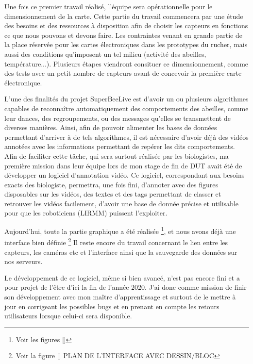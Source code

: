 \documentclass[11pt,french,a4paper]{report}
\begin{document}
\begin{titlepage}
Une fois ce premier travail réalisé, l'équipe sera opérationnelle pour le dimensionnement de la carte. Cette partie du travail
commencera par une étude des besoins et des ressources à disposition afin de choisir les capteurs en fonctions ce que nous pouvons
et devons faire. 
Les contraintes venant en grande partie de la place réservée pour les cartes électroniques dans les prototypes du rucher, mais 
aussi des conditions qu'imposent un tel milieu (activité des abeilles, température...). 
Plusieurs étapes viendront consituer ce dimensionnement, comme des tests avec un petit nombre de capteurs avant de concevoir la
première carte électronique. 

\subtitle{Développement d'un logiciel d'annotation pour les biologistes}
L'une des finalités du projet SuperBeeLive est d'avoir un ou plusieurs algorithmes capables de reconnaître automatiquement 
des comportements des abeilles, comme leur dances, des regroupements, ou des messages qu'elles se transmettent de diverses manières.
Ainsi, afin de pouvoir alimenter les bases de données permettant d'arriver à de tels algorithmes, il est nécessaire d'avoir 
déjà des vidéos annotées avec les informations permettant de repérer les dits comportements. 
Afin de faciliter cette tâche, qui sera surtout réalisée par les biologistes, ma première mission dans leur équipe lors de mon 
stage de fin de DUT avait été de développer un logiciel d'annotation vidéo. Ce logiciel, correspondant aux besoins exacts des 
biologiste, permettra, une fois fini, d'annoter avec des figures disposables sur les vidéos, des textes et des tags permettant de
classer et retrouver les vidéos facilement, d'avoir une base de donnée précise et utilisable pour que les roboticiens (LIRMM) puissent
l'exploiter. 

Aujourd'hui, toute la partie graphique a été réalisée \footnote{Voir les figures \ref{}}, et nous avons déjà une interface bien 
définie \footnote{Voir la figure \ref{} PLAN DE L'INTERFACE AVEC DESSIN/BLOC}
Il reste encore du travail concernant le lien entre les capteurs, les caméras etc et l'interface ainsi que la sauvegarde
des données sur nos serveurs. 

Le développement de ce logiciel, même si bien avancé, n'est pas encore fini et a pour projet de l'être d'ici la fin de l'année 2020. 
J'ai donc comme mission de finir son développement avec mon maître d'apprentissage et surtout de le mettre à jour en corrigeant les 
possibles bugs et en prenant en compte les retours utilisateurs lorsque celui-ci sera disponible. 



\end{titlepage}
\end{document}
